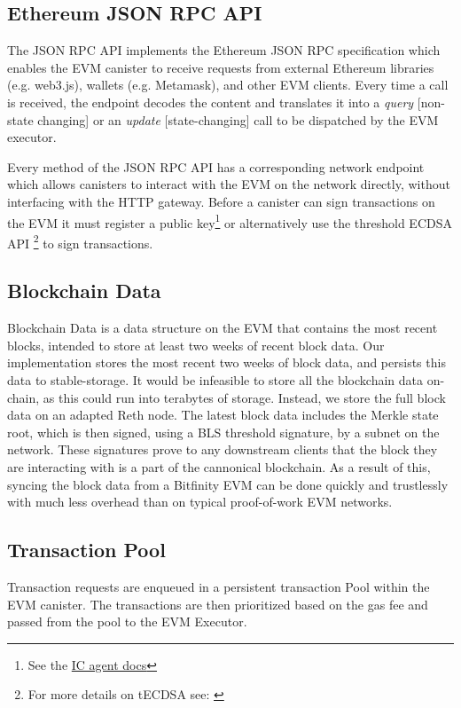\documentclass{article}
\begin{document}
\subsection{Ethereum JSON RPC API}

The JSON RPC API implements the Ethereum JSON RPC specification which enables the EVM canister to receive requests from external Ethereum libraries (e.g. web3.js), wallets (e.g. Metamask), and other EVM clients. Every time a call is received, the endpoint decodes the content and translates it into a \textit{query} [non-state changing] or an \textit{update} [state-changing] call to be dispatched by the EVM executor. 

Every method of the JSON RPC API has a corresponding network endpoint which allows canisters to interact with the EVM on the network directly, without interfacing with the HTTP gateway. Before a canister can sign transactions on the EVM it must register a public key\footnote{See the \href{https://docs.bitfinity.network/ic-agent/overview}{IC agent docs}} or alternatively use the threshold ECDSA API \footnote{For more details on tECDSA see: \cite{tECDSAprimer}} to sign transactions.  

\subsection{Blockchain Data}
Blockchain Data is a data structure on the EVM that contains the most recent blocks, intended to store at least two weeks of recent block data. Our implementation stores the most recent two weeks of block data, and persists this data to stable-storage. It would be infeasible to store all the blockchain data on-chain, as this could run into terabytes of storage. Instead, we store the full block data on an adapted Reth node. The latest block data includes the Merkle state root, which is then signed, using a BLS threshold signature, by a subnet on the network. These signatures prove to any downstream clients that the block they are interacting with is a part of the cannonical blockchain. As a result of this, syncing the block data from a Bitfinity EVM can be done quickly and trustlessly with much less overhead than on typical proof-of-work EVM networks. 

\subsection{Transaction Pool}

Transaction requests are enqueued in a persistent transaction Pool within the EVM canister. The transactions are then prioritized based on the gas fee and passed from the pool to the EVM Executor.
\end{document}

